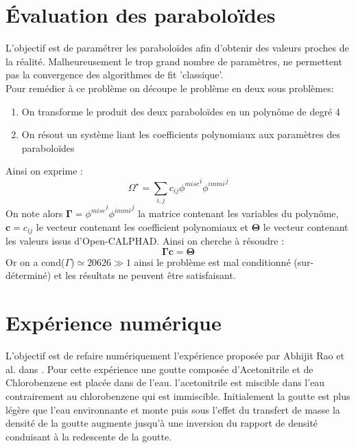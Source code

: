 \documentclass[a4paper,11pt,fleqn]{report}    %
\begin{document}
\section{Évaluation des paraboloïdes}

L'objectif est de paramétrer les paraboloïdes afin d'obtenir des valeurs proches de la réalité. Malheureusement le trop grand nombre de paramètres, ne permettent pas la convergence des algorithmes de fit 'classique'. \\
Pour remédier à ce problème on découpe le problème en deux sous problèmes:
\begin{enumerate}
	\item On transforme le produit des deux paraboloïdes en un polynôme de degré 4 
	\item On résout un système liant les coefficients polynomiaux aux paramètres des paraboloïdes
\end{enumerate} 
Ainsi on exprime :
\begin{equation}
	\Omega^{\star} = \sum_{i,j} c_{ij}\left.\phi^{misc}\right.^i\left.\phi^{immi}\right.^j
\end{equation}
On note alors $\bm{\Gamma} = \left.\phi^{misc}\right.^i\left.\phi^{immi}\right.^j $ la matrice contenant les variables du polynôme, $\bm{c} = c_{ij}$ le vecteur contenant les coefficient polynomiaux et $\bm{\Theta} $ le vecteur contenant les valeurs issus d'Open-CALPHAD. Ainsi on cherche à résoudre :
\begin{equation}
	\bm{\Gamma c = \Theta}
\end{equation}
Or on a cond($\Gamma$)$ \simeq 20626\gg 1$ ainsi le problème est mal conditionné (sur-déterminé) et les résultats ne peuvent être satisfaisant.

\section{Expérience numérique}

L'objectif est de refaire numériquement l'expérience proposée par Abhijit Rao et al. dans \cite{rao_influence_2015}. Pour cette expérience une goutte composée d'Acetonitrile et de Chlorobenzene est placée dans de l'eau. l'acetonitrile est miscible dans l'eau contrairement au chlorobenzene qui est immiscible. Initialement la goutte est plus légère que l'eau environnante et monte puis sous l'effet du transfert de masse la densité de la goutte augmente jusqu’à une inversion du rapport de densité conduisant à la redescente de la goutte.
\end{document}
